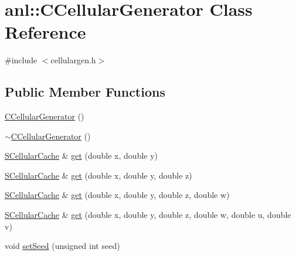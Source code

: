 \hypertarget{classanl_1_1CCellularGenerator}{
\section{anl::CCellularGenerator Class Reference}
\label{classanl_1_1CCellularGenerator}
}


{\ttfamily \#include $<$cellulargen.h$>$}\subsection*{Public Member Functions}
\begin{DoxyCompactItemize}
\item 
\hyperlink{classanl_1_1CCellularGenerator_a6adb5a1b663b11cc559959fe00380002}{CCellularGenerator} ()
\item 
\hyperlink{classanl_1_1CCellularGenerator_ac9484d5afd8478843dab92f45a08f80e}{$\sim$CCellularGenerator} ()
\item 
\hyperlink{structanl_1_1SCellularCache}{SCellularCache} \& \hyperlink{classanl_1_1CCellularGenerator_a882de06357888fd0dab4aff171bdcceb}{get} (double x, double y)
\item 
\hyperlink{structanl_1_1SCellularCache}{SCellularCache} \& \hyperlink{classanl_1_1CCellularGenerator_a003a63d92632215c3ecaa66dda725c4d}{get} (double x, double y, double z)
\item 
\hyperlink{structanl_1_1SCellularCache}{SCellularCache} \& \hyperlink{classanl_1_1CCellularGenerator_ae51488eee24d36d769f0e444ef73bb12}{get} (double x, double y, double z, double w)
\item 
\hyperlink{structanl_1_1SCellularCache}{SCellularCache} \& \hyperlink{classanl_1_1CCellularGenerator_a34445f6f242827320852d4cb83d8726f}{get} (double x, double y, double z, double w, double u, double v)
\item 
void \hyperlink{classanl_1_1CCellularGenerator_a255ce3f91d89e15aa8f7f8f41aac1908}{setSeed} (unsigned int seed)
\end{DoxyCompactItemize}
